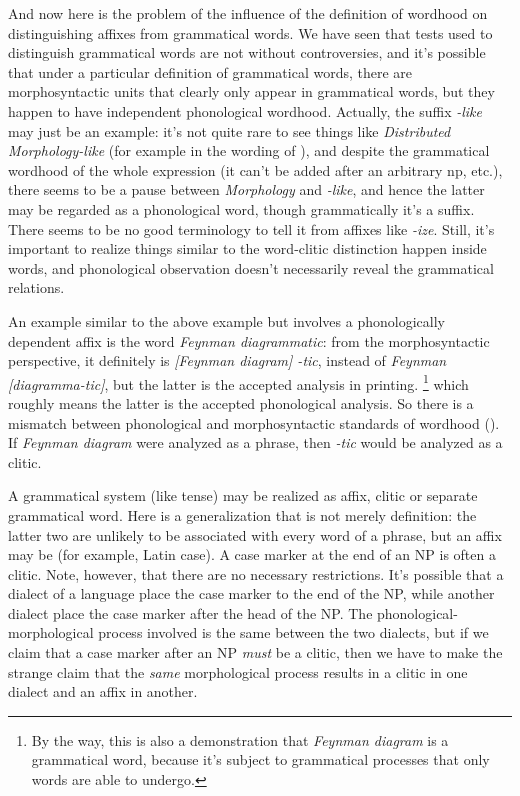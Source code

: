 \documentclass[UTF8, a4paper, oneside, scheme=plain]{ctexart}
\newcommand*{\corpus}[1]{\emph{#1}}
\begin{document}
And now here is the problem of the influence of 
the definition of wordhood on distinguishing affixes from grammatical words.
We have seen that tests used to distinguish grammatical words are not without controversies,
and it's possible that under a particular definition of grammatical words,
there are morphosyntactic units that clearly only appear in grammatical words,
but they happen to have independent phonological wordhood.
Actually, the suffix \corpus{-like} may just be an example:
it's not quite rare to see things like \corpus{Distributed Morphology-like} 
(for example in the wording of \citet{baker2010two}),
and despite the grammatical wordhood of the whole expression
(it can't be added after an arbitrary \ac{np}, etc.),
there seems to be a pause between \corpus{Morphology} and \corpus{-like},
and hence the latter may be regarded as a phonological word,
though grammatically it's a suffix.
There seems to be no good terminology to tell it from affixes like \corpus{-ize}.
Still, it's important to realize things similar to the word-clitic distinction happen inside words,
and phonological observation doesn't necessarily reveal the grammatical relations.

An example similar to the above example but involves a phonologically dependent affix 
is the word \corpus{Feynman diagrammatic}:
from the morphosyntactic perspective, 
it definitely is \corpus{[Feynman diagram] -tic},
instead of \corpus{Feynman [diagramma-tic]},
but the latter is the accepted analysis in printing.%
\footnote{
    By the way, this is also a demonstration that \corpus{Feynman diagram}
    is a grammatical word,
    because it's subject to grammatical processes that only words are able to undergo.
}
which roughly means the latter is the accepted phonological analysis.
So there is a mismatch between phonological and morphosyntactic standards of wordhood 
().
If \corpus{Feynman diagram} were analyzed as a phrase,
then \corpus{-tic} would be analyzed as a clitic.

A grammatical system (like tense) may be realized as affix, clitic or separate grammatical word. 
Here is a generalization that is not merely definition:
the latter two are unlikely to be associated with every word of a phrase, 
but an affix may be (for example, Latin case). 
A case marker at the end of an NP is often a clitic. 
Note, however, that there are no necessary restrictions. 
It's possible that a dialect of a language place the case marker to the end of the NP, 
while another dialect place the case marker after the head of the NP. 
The phonological-morphological process involved is the same between the two dialects, 
but if we claim that a case marker after an NP \emph{must} be a clitic, 
then we have to make the strange claim that 
the \emph{same} morphological process results in a clitic in one dialect and an affix in another.
\end{document}
